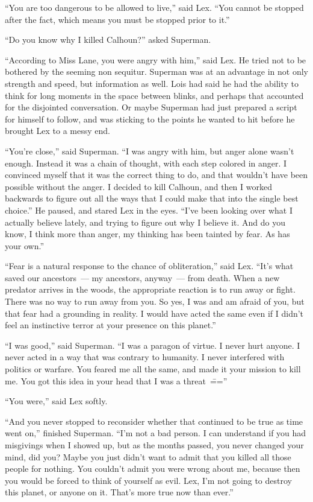 ``You are too dangerous to be allowed to live,'' said Lex. ``You cannot
be stopped after the fact, which means you must be stopped prior to
it.''

``Do you know why I killed Calhoun?'' asked Superman.

``According to Miss Lane, you were angry with him,'' said Lex. He tried
not to be bothered by the seeming non sequitur. Superman was at an
advantage in not only strength and speed, but information as well. Lois
had said he had the ability to think for long moments in the space
between blinks, and perhaps that accounted for the disjointed
conversation. Or maybe Superman had just prepared a script for himself
to follow, and was sticking to the points he wanted to hit before he
brought Lex to a messy end.

``You're close,'' said Superman. ``I was angry with him, but anger alone
wasn't enough. Instead it was a chain of thought, with each step colored
in anger. I convinced myself that it was the correct thing to do, and
that wouldn't have been possible without the anger. I decided to kill
Calhoun, and then I worked backwards to figure out all the ways that I
could make that into the single best choice.'' He paused, and stared Lex
in the eyes. ``I've been looking over what I actually believe lately,
and trying to figure out why I believe it. And do you know, I think more
than anger, my thinking has been tainted by fear. As has your own.''

``Fear is a natural response to the chance of obliteration,'' said Lex.
``It's what saved our ancestors~--- my ancestors, anyway~--- from death.
When a new predator arrives in the woods, the appropriate reaction is to
run away or fight. There was no way to run away from you. So yes, I was
and am afraid of you, but that fear had a grounding in reality. I would
have acted the same even if I didn't feel an instinctive terror at your
presence on this planet.''

``I was good,'' said Superman. ``I was a paragon of virtue. I never hurt
anyone. I never acted in a way that was contrary to humanity. I never
interfered with politics or warfare. You feared me all the same, and
made it your mission to kill me. You got this idea in your head that I
was a threat~\===''

``You were,'' said Lex softly.

``And you never stopped to reconsider whether that continued to be true
as time went on,'' finished Superman. ``I'm not a bad person. I can
understand if you had misgivings when I showed up, but as the months
passed, you never changed your mind, did you? Maybe you just didn't want
to admit that you killed all those people for nothing. You couldn't
admit you were wrong about me, because then you would be forced to think
of yourself as evil. Lex, I'm not going to destroy this planet, or
anyone on it. That's more true now than ever.''

